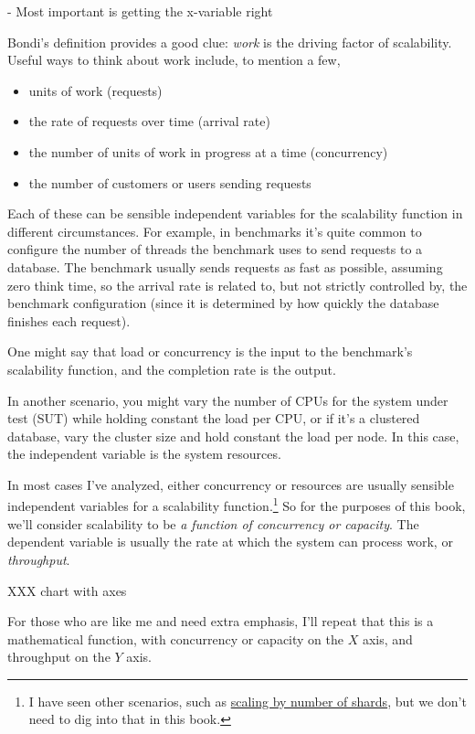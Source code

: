 \documentclass{vivid_layout}
\begin{document}
- Most important is getting the x-variable right

Bondi's definition provides a good clue: {\itshape work} is the driving factor
of scalability. Useful ways to think about work include, to mention a few,

\begin{itemize}
\item units of work (requests)
\item the rate of requests over time (arrival rate)
\item the number of units of work in progress at a time (concurrency)
\item the number of customers or users sending requests
\end{itemize}

Each of these can be sensible independent variables for the scalability function
in different circumstances. For example, in benchmarks it's quite common to
configure the number of threads the benchmark uses to send requests to a
database. The benchmark usually sends requests as fast as possible, assuming
zero think time, so the arrival rate is related to, but not strictly controlled
by, the benchmark configuration (since it is determined by how quickly the database finishes each request).

One might say that load or concurrency is the input to the benchmark's
scalability function, and the completion rate is the output.

In another scenario, you might vary the number of CPUs for the system under test
(SUT) while holding constant the load per CPU, or if it's a clustered database,
vary the cluster size and hold constant the load per node. In this case, the
independent variable is the system resources.

In most cases I've analyzed, either concurrency or resources are usually
sensible independent variables for a scalability function.\footnote{I have seen
other scenarios, such as
\href{https://www.percona.com/blog/2011/02/28/is-voltdb-really-as-scalable-as-they-claim/}{scaling
by number of shards}, but we don't need to dig into that in this book.} So for
the purposes of this book, we'll consider scalability to be {\itshape a function
of concurrency or capacity}. The dependent variable is usually the rate at which
the system can process work, or {\itshape throughput}.

XXX chart with axes

For those who are like me and need extra emphasis, I'll repeat that this is a
mathematical function, with concurrency or capacity on the $X$ axis, and
throughput on the $Y$ axis.
\end{document}
